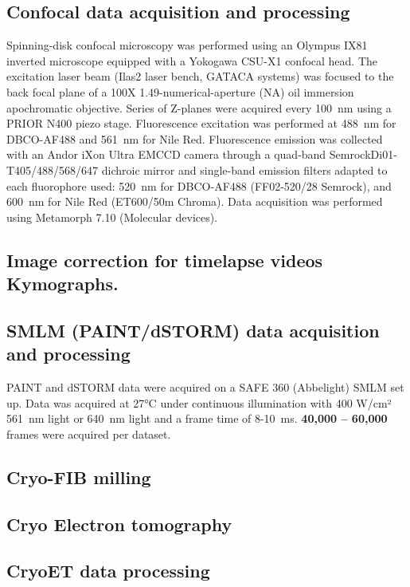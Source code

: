 \subsection{Confocal data acquisition and processing}

Spinning-disk confocal microscopy was performed using an Olympus IX81 inverted microscope equipped with a Yokogawa CSU-X1 confocal head.
The excitation laser beam (Ilas2 laser bench, GATACA systems) was focused to the back focal plane of a 100X 1.49-numerical-aperture (NA) oil immersion apochromatic objective.
Series of Z-planes were acquired every \qty{100}{nm} using a PRIOR N400 piezo stage.
Fluorescence excitation was performed at \qty{488}{nm} for DBCO-AF488 and \qty{561}{nm} for Nile Red.
Fluorescence emission was collected with an Andor iXon Ultra EMCCD camera through a quad-band Semrock\texttrademark Di01-T405/488/568/647 dichroic mirror and single-band emission filters adapted to each fluorophore used: \qty{520}{nm} for DBCO-AF488 (FF02-520/28 Semrock\texttrademark), and \qty{600}{nm} for Nile Red (ET600/50m Chroma\texttrademark).
Data acquisition was performed using Metamorph 7.10 (Molecular devices).

\subsection{Image correction for timelapse videos Kymographs.}

\subsection{SMLM (PAINT/dSTORM) data acquisition and processing}

PAINT and dSTORM data were acquired on a SAFE 360 (Abbelight) SMLM set up.
Data was acquired at 27°C under continuous illumination with 400 W/cm² \qty{561}{nm} light or \qty{640}{nm} light and a frame time of 8-\qty{10}{ms}.
\textbf{40,000 -- 60,000} frames were acquired per dataset.

\subsection{Cryo-FIB milling}

\subsection{Cryo Electron tomography}

\subsection{CryoET data processing}
